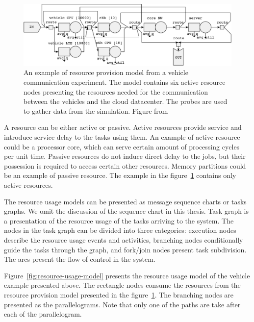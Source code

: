 \begin{figure}[]
  \begin{center}
    \includegraphics[width=\textwidth]{images/pse-models/pse-rn-example.pdf}
    \caption{An example of resource provision model from a vehicle communication experiment. The model contains six active resource nodes presenting the resources needed for the communication between the vehicles and the cloud datacenter. The probes are used to gather data from the simulation. Figure from~\cite{TODO: cite PSE manual}}
    \label{fig:resource-provision-model}
  \end{center}
\end{figure}

A resource can be either active or passive. Active resources provide service and introduce service delay to the tasks using them. An example of active resource could be a processor core, which can serve certain amount of processing cycles per unit time. Passive resources do not induce direct delay to the jobs, but their possession is required to access certain other resources. Memory partitions could be an example of passive resource. The example in the figure~\ref{fig:resource-provision-model} contains only active resources.

The resource usage models can be presented as message sequence charts or tasks graphs. We omit the discussion of the sequence chart in this thesis. Task graph is a presentation of the resource usage of the tasks arriving to the system. The nodes in the task graph can be divided into three categories: execution nodes describe the resource usage events and activities, branching nodes conditionally guide the tasks through the graph, and fork/join nodes present task subdivision. The arcs present the flow of control in the system.

Figure~\ref{fig:resource-usage-model} presents the resource usage model of the vehicle example presented above. The rectangle nodes consume the resources from the resource provision model presented in the figure~\ref{fig:resource-provision-model}. The branching nodes are presented as the parallelograms. Note that only one of the paths are take after each of the parallelogram.

